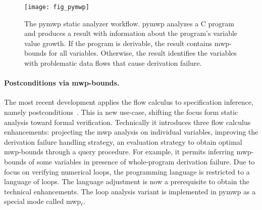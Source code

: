 \begin{figure}[t]
\centering
\texttt{[image: fig\_pymwp]}
\caption[The pymwp static analyzer workflow.]{
The pymwp static analyzer workflow.
pymwp analyzes a C program
and produces a result with information about the program's variable value growth.
If the program is derivable, the result contains mwp-bounds for all variables.
Otherwise, the result identifies the variables with problematic data flows that cause derivation failure.
}\label{fig:pymwp}
\end{figure}

\paragraph*{Postconditions via mwp-bounds.}
The most recent development applies the flow calculus to specification inference, namely postconditions~\cite{rusch2025}.
This ia new use-case, shifting the focus form static analysis toward formal verification.
Technically it introduces three flow calculus enhancements:
projecting the mwp analysis on individual variables, improving the derivation failure handling strategy, an evaluation strategy to obtain optimal mwp-bounds through a query procedure.
For example, it permits inferring mwp-bounds of some variables in presence of whole-program derivation failure.
Due to focus on verifying numerical loops, the programming language is restricted to a language of loops.
The language adjustment is now a prerequisite to obtain the technical enhancements.
The loop analysis variant is implemented in pymwp as a special mode called mwp\(_\ell\).

